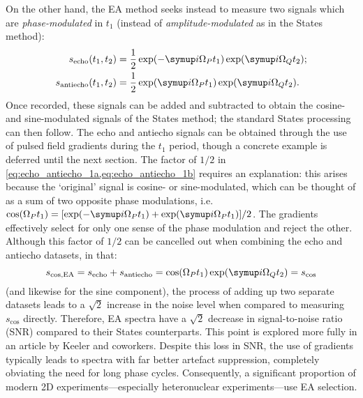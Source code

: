 On the other hand, the EA method seeks instead to measure two signals which are \textit{phase-modulated} in $t_1$ (instead of \textit{amplitude-modulated} as in the States method):
\begin{align}
    s_\text{echo}(t_1, t_2) &= \frac{1}{2}\exp(-\mi\Omega_P t_1)\exp(\mi\Omega_Q t_2); \label{eq:echo_antiecho_1a} \\
    s_\text{antiecho}(t_1, t_2) &= \frac{1}{2}\exp(\mi\Omega_P t_1)\exp(\mi\Omega_Q t_2). \label{eq:echo_antiecho_1b}
\end{align}
Once recorded, these signals can be added and subtracted to obtain the cosine- and sine-modulated signals of the States method; the standard States processing can then follow.
The echo and antiecho signals can be obtained through the use of pulsed field gradients during the $t_1$ period, though a concrete example is deferred until the next section.
The factor of $1/2$ in \cref{eq:echo_antiecho_1a,eq:echo_antiecho_1b} requires an explanation: this arises because the `original' signal is cosine- or sine-modulated, which can be thought of as a sum of two opposite phase modulations, i.e.\ $\cos(\Omega_P t_1) = [\exp(-\mi\Omega_P t_1) + \exp(\mi\Omega_P t_1)]/2$.
The gradients effectively select for only one sense of the phase modulation and reject the other.
Although this factor of $1/2$ can be cancelled out when combining the echo and antiecho datasets, in that:
\begin{equation}
    \label{eq:s_cos_from_antiecho}
    s_\text{cos,EA} = s_\text{echo} + s_\text{antiecho} = \cos(\Omega_P t_1)\exp(\mi\Omega_Q t_2) = s_\text{cos}
\end{equation}
(and likewise for the sine component), the process of adding up two separate datasets leads to a $\sqrt{2}$ increase in the noise level when compared to measuring $s_\text{cos}$ directly.
Therefore, EA spectra have a $\sqrt{2}$ decrease in signal-to-noise ratio (SNR) compared to their States counterparts.
This point is explored more fully in an article by Keeler and coworkers.\autocite{Kontaxis1994JMRSA}
Despite this loss in SNR, the use of gradients typically leads to spectra with far better artefact suppression, completely obviating the need for long phase cycles.
Consequently, a significant proportion of modern 2D experiments---especially heteronuclear experiments---use EA selection.
